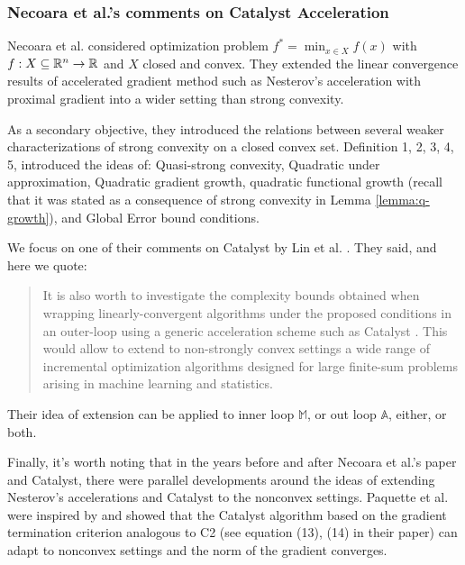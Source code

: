 \documentclass[12pt]{article}
\begin{document}
        \subsubsection{Necoara et al.'s comments on Catalyst Acceleration}
            Necoara et al. \cite{necoara_linear_2019} considered optimization problem $f^* = \min_{x \in X} f(x)$ with $f: X \subseteq \mathbb R^n \rightarrow \mathbb R$ and $X$ closed and convex. 
            They extended the linear convergence results of accelerated gradient method such as Nesterov's acceleration with proximal gradient into a wider setting than strong convexity. 
            \par
            As a secondary objective, they introduced the relations between several weaker characterizations of strong convexity on a closed convex set. 
            Definition 1, 2, 3, 4, 5, introduced the ideas of: Quasi-strong convexity, Quadratic under approximation, Quadratic gradient growth, quadratic functional growth (recall that it was stated as a consequence of strong convexity in Lemma \ref{lemma:q-growth}), and Global Error bound conditions. 
            \par
            We focus on one of their comments on Catalyst by Lin et al. \cite{lin_universal_2015}. 
            They said, and here we quote: 
            \begin{quote}
                It is also worth to investigate the complexity bounds obtained when wrapping linearly-convergent algorithms under the proposed conditions in an outer-loop using a generic acceleration scheme such as Catalyst \cite{lin_universal_2015}. 
                This would allow to extend to non-strongly convex settings a wide range of incremental optimization algorithms designed for large finite-sum problems arising in machine learning and statistics.
            \end{quote}
            Their idea of extension can be applied to inner loop $\mathbb M$, or out loop $\mathbb A$, either, or both. 
            \par
            Finally, it's worth noting that in the years before and after Necoara et al.'s paper and Catalyst, there were parallel developments around the ideas of extending Nesterov's accelerations and Catalyst to the nonconvex settings. 
            Paquette et al. \cite{paquette_catalyst_2018} were inspired by \cite{ghadimi_accelerated_2016} and showed that the Catalyst algorithm based on the gradient termination criterion analogous to C2 (see equation (13), (14) in their paper) can adapt to nonconvex settings and the norm of the gradient converges. 
\end{document}

